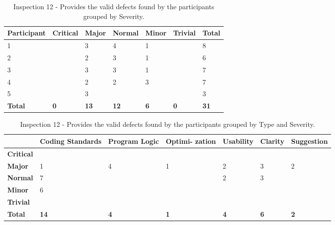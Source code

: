 \begin{table}[!h]
  \begin{center}
    \caption[Inspection 12 - Results by Severity]{Inspection 12
      - Provides the valid defects found by the participants grouped by
      Severity.}
    \label{tab:inspection-results-12}
    \begin{tabular}{|p{2.0cm}|p{1.5cm}|p{1.5cm}|p{1.5cm}|p{1.5cm}|p{1.5cm}|p{1.5cm}|} \hline
{\bf Participant} & {\bf Critical} & {\bf Major} 
& {\bf Normal} & {\bf Minor} & {\bf Trivial} & {\bf Total} \\ \hline
1 &   & 3 & 4 & 1 &   & 8 \\ \hline
2 &   & 2 & 3 & 1 &   & 6 \\ \hline
3 &   & 3 & 3 & 1 &   & 7 \\ \hline
4 &   & 2 & 2 & 3 &   & 7 \\ \hline
5 &   & 3 &   &   &   & 3 \\ \hline
{\bf Total} & {\bf 0} & {\bf 13} & {\bf 12} & {\bf 6} & {\bf 0} & {\bf 31} \\ \hline
    \end{tabular}
  \end{center}
\end{table}

\begin{table}[!h]
  \begin{center}
    \caption[Inspection 12 - Results by Type and Severity]{Inspection 12 -
      Provides the valid defects found by the participants grouped by Type
      and Severity.}
    \label{tab:inspection-results-12-type}
    \begin{tabular}{|p{2.0cm}|p{1.7cm}|p{1.5cm}|p{1.7cm}|p{1.4cm}|p{1.4cm}|p{1.5cm}|}  \hline   
\small{} & \small{}{\bf Coding Standards} & 
\small{}{\bf Program Logic} & \small{} {\bf Optimi- zation} & 
\small{}{\bf Usability} & \small{} {\bf Clarity} & 
\small{} {\bf Suggestion} \\ \hline

{\bf Critical} &   &   &   &   &   &   \\ \hline
{\bf Major}    & 1 & 4 & 1 & 2 & 3 & 2 \\ \hline
{\bf Normal}   & 7 &   &   & 2 & 3 &   \\ \hline
{\bf Minor}    & 6 &   &   &   &   &   \\ \hline
{\bf Trivial}  &   &   &   &   &   &   \\ \hline

{\bf Total} & {\bf 14} & {\bf 4} & {\bf 1} & {\bf 4} & {\bf 6} & {\bf 2} \\ \hline

    \end{tabular}
  \end{center}
\end{table}


